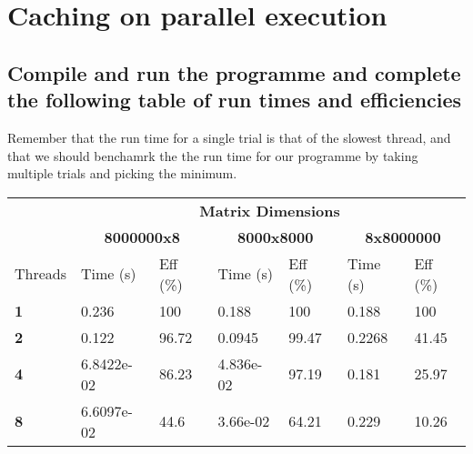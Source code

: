 


\section{Caching on parallel execution}

\subsection{Compile and run the programme and complete the following table of run times and efficiencies}

Remember that the run time for a single trial is that of the slowest thread, and that we should benchamrk the
the run time for our programme by taking multiple trials and picking the minimum.

\begin{tabular}{ |p{2cm}|p{2cm}|p{2cm}|p{2cm}|p{2cm}|p{2cm}|p{2cm}| }
    \hline
    \multirow{2}{4em}{} & \multicolumn{6}{|c|}{\textbf{Matrix Dimensions}} \\
    \cline{2-7}
    & \multicolumn{2}{|c|}{\textbf{8000000x8}} 
    & \multicolumn{2}{|c|}{\textbf{8000x8000}} 
    & \multicolumn{2}{|c|}{\textbf{8x8000000}} \\
    \hline
    Threads & Time (s) & Eff (\%) & Time (s) & Eff (\%) & Time (s) & Eff (\%) \\
    \hline
    \textbf{1} & 0.236 & 100 & 0.188 & 100 & 0.188 & 100 \\
    \hline
    \textbf{2} & 0.122 & 96.72 & 0.0945 & 99.47 & 0.2268 & 41.45 \\
    \hline
    \textbf{4} & 6.8422e-02 & 86.23 & 4.836e-02 & 97.19 & 0.181 & 25.97 \\
    \hline
    \textbf{8} & 6.6097e-02 & 44.6 & 3.66e-02 & 64.21 & 0.229 & 10.26 \\
    \hline
\end{tabular}